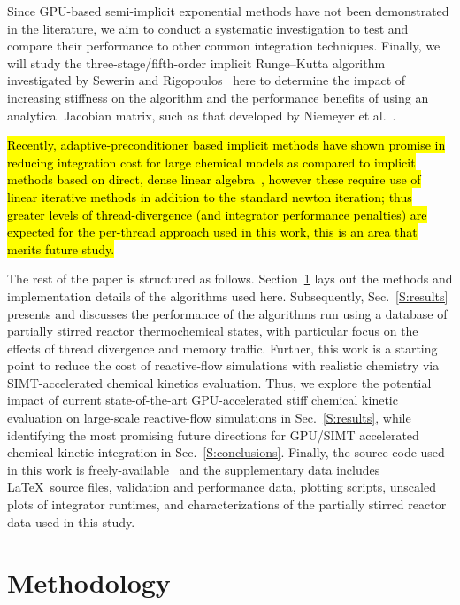 \documentclass[preprint,review,11pt]{elsarticle}
\DeclareRobustCommand{\hlg}[1]{\sethlcolor{green}\hl{#1}}
\DeclareRobustCommand{\hlg}[1]{\empty{#1}}
\begin{document}
Since GPU-based semi-implicit exponential methods have not been demonstrated in the literature, we aim to conduct a systematic investigation to test and compare their performance to other common integration techniques.
Finally, we will study the three-stage\slash fifth-order implicit Runge--Kutta algorithm~\cite{wanner1991solving} investigated by Sewerin and Rigopoulos~\cite{Sewerin20151375} here to determine the impact of increasing stiffness on the algorithm and the performance benefits of using an analytical Jacobian matrix, such as that developed by Niemeyer et al.~\cite{niemeyer_2016_51139,Niemeyer:2015ws,Niemeyer:2016aa}.

\hlg{Recently, adaptive-preconditioner based implicit methods have shown promise in reducing integration cost for large chemical models as compared to implicit methods based on direct, dense linear algebra~\cite{mcnenly2013adaptive}, however these require use of linear iterative methods in addition to the standard newton iteration; thus greater levels of thread-divergence (and integrator performance penalties) are expected for the per-thread approach used in this work, this is an area that merits future study.}

The rest of the paper is structured as follows.
Section~\ref{S:method} lays out the methods and implementation details of the algorithms used here.
Subsequently, Sec.~\ref{S:results} presents and discusses the performance of the algorithms run using a database of partially stirred reactor thermochemical states, with particular focus on the effects of thread divergence and memory traffic.
Further, this work is a starting point to reduce the cost of reactive-flow simulations with realistic chemistry via SIMT-accelerated chemical kinetics evaluation.
Thus, we explore the potential impact of current state-of-the-art GPU-accelerated stiff chemical kinetic evaluation on large-scale reactive-flow simulations in Sec.~\ref{S:results}, while identifying the most promising future directions for GPU\slash SIMT accelerated chemical kinetic integration in Sec.~\ref{S:conclusions}.
Finally, the source code used in this work is freely-available~\cite{accelerInt:beta} and the supplementary data includes \LaTeX\ source files, validation and performance data, plotting scripts, unscaled plots of integrator runtimes, and characterizations of the partially stirred reactor data used in this study.

\section{Methodology}
\label{S:method}
\end{document}
